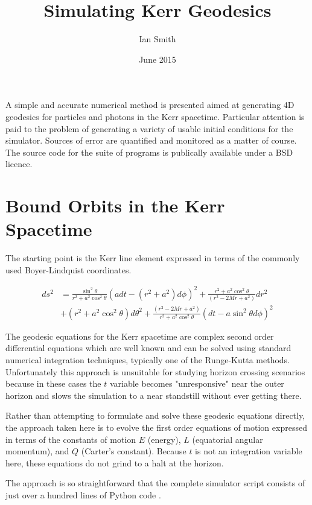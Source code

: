 \documentclass[11pt]{article}
\title{\textbf{Simulating Kerr Geodesics}}
\author{Ian Smith}
\date{June 2015}
\begin{document}
\maketitle

\abstract
A simple and accurate numerical method is presented aimed at generating 4D geodesics for particles and photons in the Kerr spacetime.  Particular attention is paid to the problem of generating a variety of usable initial conditions for the simulator.  Sources of error are quantified and monitored as a matter of course.  The source code for the suite of programs is publically available under a BSD licence.

\section{Bound Orbits in the Kerr Spacetime}

The starting point is the Kerr line element expressed in terms of the commonly used Boyer-Lindquist coordinates.

\begin{align*}
d s^2 &= \frac{ \sin^2 \theta } {r^2 + a^2 \cos^2 \theta} (a dt - (r^2 + a^2)d \phi )^2 + \frac{ r^2 + a^2 \cos^2 \theta } {(r^2 - 2Mr  + a^2)} d r^2 \\
&+ (r^2 + a^2 \cos^2 \theta) d \theta^2 + \frac{ (r^2 - 2Mr  + a^2) } {r^2 + a^2 \cos^2 \theta} (dt - a \sin^2 \theta d \phi )^2
\end{align*}

The geodesic equations for the Kerr spacetime are complex second order differential equations which are well known and can be solved using standard numerical integration techniques, typically one of the Runge-Kutta methods.  Unfortunately this approach is unsuitable for studying horizon crossing scenarios because in these cases the $t$ variable becomes "unresponsive" near the outer horizon and slows the simulation to a near standstill without ever getting there.

Rather than attempting to formulate and solve these geodesic equations directly, the approach taken here is to evolve the first order equations of motion expressed in terms of the constants of motion $E$ (energy), $L$ (equatorial angular momentum), and $Q$ (Carter's constant).  Because $t$ is not an integration variable here, these equations do not grind to a halt at the horizon.

The approach is so straightforward that the complete simulator script consists of just over a hundred lines of Python code \cite{m4r35n357}.
\end{document}
